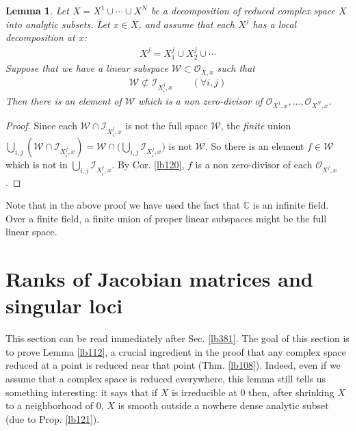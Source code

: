 \documentclass[12pt,b5paper,notitlepage]{report}
\theoremstyle{definition}
\theoremstyle{plain}
\newtheorem{lm}[df]{Lemma}
\newcommand{\scr}{\mathscr}
\newcommand{\Cbb}{\mathbb C}
\numberwithin{equation}{section}
\begin{document}
\begin{lm}\label{lb145}
Let $X=X^1\cup\cdots\cup X^N$ be a decomposition of reduced complex space $X$ into analytic subsets. Let $x\in X$, and assume that each $X^j$ has a local decomposition at $x$:
\begin{align*}
X^j=X^j_1\cup X^j_2\cup\cdots
\end{align*}
Suppose that we have a linear subspace $\scr W\subset\scr O_{X,x}$ such that
\begin{align*}
\scr W\nsubset \scr I_{X^j_i,x}\qquad (\forall i,j)
\end{align*}
Then there is an element of $\scr W$ which is a non zero-divisor of $\scr O_{X^1,x},\dots,\scr O_{X^N,x}$.
\end{lm}

\begin{proof}
Since each $\scr W\cap \scr I_{X^j_i,x}$ is not the full space $\scr W$, the \textit{finite} union $\bigcup_{i,j} (\scr W\cap\scr I_{X_i^j,x})=\scr W\cap \big(\bigcup_{i,j}\scr I_{X_i^j,x}\big)$ is not $\scr W$. So there is an element $f\in\scr W$ which is not in $\bigcup_{i,j}\scr I_{X_i^j,x}$. By Cor. \ref{lb120}, $f$ is a non zero-divisor of each $\scr O_{X^j,x}$.
\end{proof}

Note that in the above proof we have used the fact that $\Cbb$ is an infinite field. Over a finite field, a finite union of proper linear subspaces might be the full linear space.

























\section{Ranks of Jacobian matrices and singular loci}\label{lb119}



This section can be read immediately after Sec. \ref{lb381}. The goal of this section is to prove Lemma \ref{lb112}, a crucial ingredient in the proof that any complex space reduced at a point is reduced near that point (Thm. \ref{lb108}). Indeed, even if we assume that a complex space is reduced everywhere, this lemma still tells us something interesting: it says that if $X$ is irreducible at $0$ then, after shrinking $X$ to a neighborhood of $0$, $X$ is smooth outside a nowhere dense analytic subset (due to Prop. \ref{lb121}). 
\end{document}
